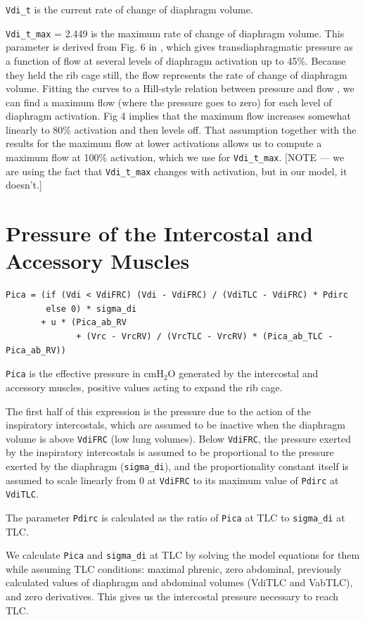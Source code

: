 \documentclass[12pt,openany,oneside]{book}
\begin{document}
\verb~Vdi_t~ is the current rate of change of diaphragm volume.

\verb~Vdi_t_max~ = 2.449 is the maximum rate of change of diaphragm
volume. This parameter is derived from Fig. 6 in
\citet{Goldman01061978}, which gives transdiaphragmatic pressure as a
function of flow at several levels of diaphragm activation up to 45\%.
Because they held the rib cage still, the flow represents the rate of
change of diaphragm volume. Fitting the curves to a Hill-style
relation between pressure and flow \citep{Younes01101981}, we can find
a maximum flow (where the pressure goes to zero) for each level of
diaphragm activation. \citet{Chow01031999} Fig 4 implies that the
maximum flow increases somewhat linearly to 80\% activation and then
levels off. That assumption together with the results for the maximum
flow at lower activations allows us to compute a maximum flow at 100\%
activation, which we use for \verb~Vdi_t_max~. [NOTE --- we are using
the fact that \verb~Vdi_t_max~ changes with activation, but in our
model, it doesn't.]

\section{Pressure of the Intercostal and Accessory Muscles}
\begin{verbatim}
Pica = (if (Vdi < VdiFRC) (Vdi - VdiFRC) / (VdiTLC - VdiFRC) * Pdirc
        else 0) * sigma_di
       + u * (Pica_ab_RV
              + (Vrc - VrcRV) / (VrcTLC - VrcRV) * (Pica_ab_TLC - Pica_ab_RV))
\end{verbatim}

\verb~Pica~ is the effective pressure in cmH$_2$O generated by the
intercostal and accessory muscles, positive values acting to expand
the rib cage.

The first half of this expression is the pressure due to the action of
the inspiratory intercostals, which are assumed to be inactive when
the diaphragm volume is above \verb~VdiFRC~ (low lung volumes). Below
\verb~VdiFRC~, the pressure exerted by the inspiratory intercostals is
assumed to be proportional to the pressure exerted by the diaphragm
(\verb~sigma_di~), and the proportionality constant itself is assumed
to scale linearly from 0 at \verb~VdiFRC~ to its maximum value of
\verb~Pdirc~ at \verb~VdiTLC~.

The parameter \verb~Pdirc~ is calculated as the ratio of \verb~Pica~
at TLC to \verb~sigma_di~ at TLC.

We calculate \verb~Pica~ and \verb~sigma_di~ at TLC by solving the
model equations for them while assuming TLC conditions: maximal
phrenic, zero abdominal, previously calculated values of diaphragm and
abdominal volumes (VdiTLC and VabTLC), and zero derivatives. This
gives us the intercostal pressure necessary to reach TLC.
\end{document}
